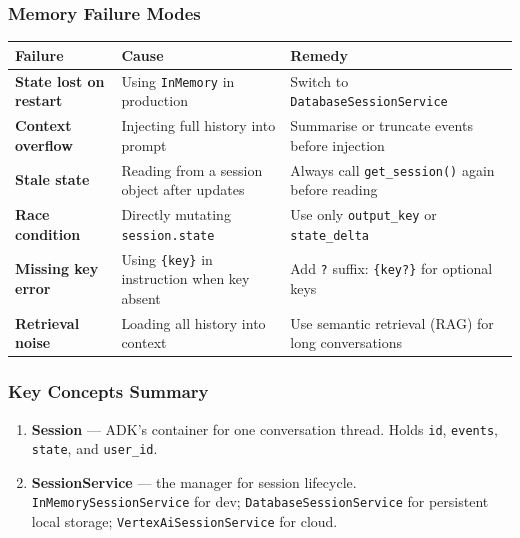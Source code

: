 \documentclass[12pt, a4paper]{article}
\newcommand{\kterm}[1]{\textbf{\textcolor{keyterm}{#1}}}
\begin{document}
\begin{theorybox}
\subsubsection*{Memory Failure Modes}

\medskip
\begin{center}\small
\begin{tabular}{>{\bfseries}p{3.2cm} p{4cm} p{3.8cm}}
\toprule
\textbf{Failure} & \textbf{Cause} & \textbf{Remedy} \\
\midrule
State lost on restart & Using \texttt{InMemory} in production & Switch to \texttt{DatabaseSessionService} \\
\addlinespace
Context overflow & Injecting full history into prompt & Summarise or truncate events before injection \\
\addlinespace
Stale state & Reading from a session object after updates & Always call \texttt{get\_session()} again before reading \\
\addlinespace
Race condition & Directly mutating \texttt{session.state} & Use only \texttt{output\_key} or \texttt{state\_delta} \\
\addlinespace
Missing key error & Using \texttt{\{key\}} in instruction when key absent & Add \texttt{?} suffix: \texttt{\{key?\}} for optional keys \\
\addlinespace
Retrieval noise & Loading all history into context & Use semantic retrieval (RAG) for long conversations \\
\bottomrule
\end{tabular}
\end{center}
\medskip

\subsubsection*{Key Concepts Summary}

\begin{enumerate}[leftmargin=*, label=\textbf{\arabic*.}, itemsep=4pt]
  \item \kterm{Session} --- ADK's container for one conversation thread. Holds
    \texttt{id}, \texttt{events}, \texttt{state}, and \texttt{user\_id}.

  \item \kterm{SessionService} --- the manager for session lifecycle.
    \texttt{InMemorySessionService} for dev; \texttt{DatabaseSessionService} for
    persistent local storage; \texttt{VertexAiSessionService} for cloud.


\end{enumerate}
\end{theorybox}
\end{document}
